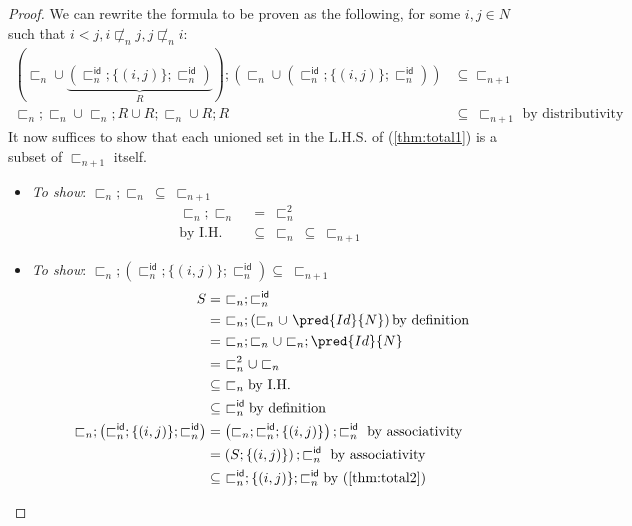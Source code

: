 {\begin{proof}
We can rewrite the formula to be proven as the following, for some $i, j \in N$ such that $i < j, i \not\sqsubset_n j, j \not\sqsubset_n i$:
\begin{align}
	\left( \sqsubset_n \cup \underbrace{\left( \sqsubset_n^\mathsf{id} ; \{ (i, j) \} ; \sqsubset_n^\mathsf{id} \right)}_{R} \right) ; \left( \sqsubset_n \cup \left( \sqsubset_n^\mathsf{id} ; \{ (i, j) \} ; \sqsubset_n^\mathsf{id} \right) \right) &\subseteq \sqsubset_{n + 1} \\
	\label{thm:total1} \sqsubset_n ; \sqsubset_n \cup \sqsubset_n ; R \cup R ; \sqsubset_n \cup R ; R &\subseteq\ \sqsubset_{n + 1} \text{ by distributivity}
\end{align}
It now suffices to show that each unioned set in the L.H.S. of (\ref{thm:total1}) is a subset of $\sqsubset_{n + 1}$ itself.
\begin{itemize}
	\item \textit{To show}: $\sqsubset_n ; \sqsubset_n\ \subseteq\ \sqsubset_{n + 1}$
		\begin{align}
			\sqsubset_n ; \sqsubset_n\ &=\ \sqsubset_n^2 \\
			\text{by I.H.}&\subseteq\ \sqsubset_n\ \subseteq\ \sqsubset_{n + 1}
		\end{align}
	\item \textit{To show}: $\sqsubset_n ; \left( \sqsubset_n^\mathsf{id} ; \{ (i, j) \} ; \sqsubset_n^\mathsf{id} \right) \subseteq\ \sqsubset_{n + 1}$
		\begin{align}
			S  &=\ \sqsubset_n ; \sqsubset_n^\mathsf{id} \\
				&=\ \sqsubset_n ; \left( \sqsubset_n \cup\ \pred{Id}{N} \right) \text{by definition} \\
				&=\ \sqsubset_n ; \sqsubset_n \cup \sqsubset_n ; \pred{Id}{N} \\
				&=\ \sqsubset_n^2 \cup \sqsubset_n \\
				&\subseteq\ \sqsubset_n \text{by I.H.} \\
				\label{thm:total2} &\subseteq\ \sqsubset_n^\mathsf{id} \text{by definition} \\
			\sqsubset_n ; \left( \sqsubset_n^\mathsf{id} ; \{ (i, j) \} ; \sqsubset_n^\mathsf{id} \right) &= \left( \sqsubset_n ; \sqsubset_n^\mathsf{id} ; \{ (i, j) \} \right) ; \sqsubset_n^\mathsf{id} \text{ by associativity} \\
			&= \left( S ; \{ (i, j) \} \right) ; \sqsubset_n^\mathsf{id} \text{ by associativity} \\
			&\subseteq\ \sqsubset_n^\mathsf{id} ; \{ (i, j) \} ; \sqsubset_n^\mathsf{id} \text{by (\ref{thm:total2})} \\

\end{align}
\end{itemize}
\end{proof}}
